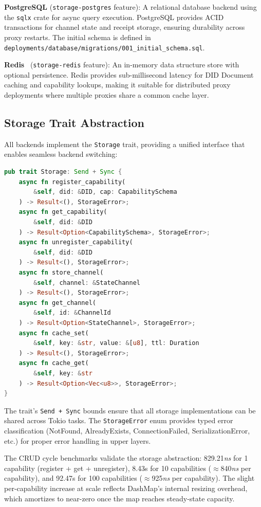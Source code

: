 \textbf{PostgreSQL} (\texttt{storage-postgres} feature): A relational database backend using the \texttt{sqlx} crate for async query execution. PostgreSQL provides ACID transactions for channel state and receipt storage, ensuring durability across proxy restarts. The initial schema is defined in \texttt{deployments/database/migrations/001\_initial\_schema.sql}.

\textbf{Redis}~\cite{redis2009} (\texttt{storage-redis} feature): An in-memory data structure store with optional persistence. Redis provides sub-millisecond latency for DID Document caching and capability lookups, making it suitable for distributed proxy deployments where multiple proxies share a common cache layer.

\subsection{Storage Trait Abstraction}

All backends implement the \texttt{Storage} trait, providing a unified interface that enables seamless backend switching:

\begin{lstlisting}[language=Rust, caption={Storage trait definition.}]
pub trait Storage: Send + Sync {
    async fn register_capability(
        &self, did: &DID, cap: CapabilitySchema
    ) -> Result<(), StorageError>;
    async fn get_capability(
        &self, did: &DID
    ) -> Result<Option<CapabilitySchema>, StorageError>;
    async fn unregister_capability(
        &self, did: &DID
    ) -> Result<(), StorageError>;
    async fn store_channel(
        &self, channel: &StateChannel
    ) -> Result<(), StorageError>;
    async fn get_channel(
        &self, id: &ChannelId
    ) -> Result<Option<StateChannel>, StorageError>;
    async fn cache_set(
        &self, key: &str, value: &[u8], ttl: Duration
    ) -> Result<(), StorageError>;
    async fn cache_get(
        &self, key: &str
    ) -> Result<Option<Vec<u8>>, StorageError>;
}
\end{lstlisting}

The trait's \texttt{Send + Sync} bounds ensure that all storage implementations can be shared across Tokio tasks. The \texttt{StorageError} enum provides typed error classification (NotFound, AlreadyExists, ConnectionFailed, SerializationError, etc.) for proper error handling in upper layers.

The CRUD cycle benchmarks validate the storage abstraction: 829.21\textit{ns} for 1 capability (register + get + unregister), 8.43\textmu s for 10 capabilities ($\approx$840\textit{ns} per capability), and 92.47\textmu s for 100 capabilities ($\approx$925\textit{ns} per capability). The slight per-capability increase at scale reflects DashMap's internal resizing overhead, which amortizes to near-zero once the map reaches steady-state capacity.